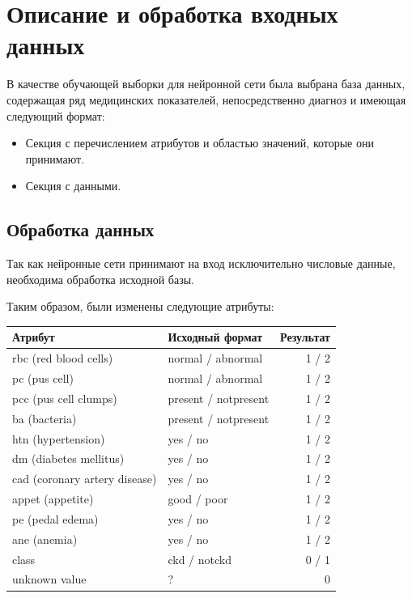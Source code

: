 \section{Описание и обработка входных данных}
 В качестве обучающей выборки для нейронной сети была выбрана база данных, содержащая ряд медицинских показателей, непосредственно диагноз и имеющая следующий формат:
 
 \begin{itemize}
 	\item
 		Секция с перечислением атрибутов и областью значений, которые они принимают.
 	\item 
 		Секция с данными.
 \end{itemize}
 
\subsection{Обработка данных}

	Так как нейронные сети принимают на вход исключительно числовые данные, необходима обработка исходной базы.
	
	Таким образом, были изменены следующие атрибуты:
	\\
	\begin{table}[H]
	\centering
	\begin{tabular}{llr}
	\toprule
	Атрибут  & Исходный формат & Результат \\
	\midrule 
	 rbc (red blood cells)      & normal / abnormal    & 1 / 2 \\
	 pc (pus cell)      & normal / abnormal    & 1 / 2 \\
	 pcc (pus cell clumps)      & present / notpresent    & 1 / 2 \\
	 ba (bacteria)      & present / notpresent   & 1 / 2 \\
	 htn (hypertension)      & yes / no   & 1 / 2 \\
	 dm (diabetes mellitus)      & yes / no   & 1 / 2 \\
	 cad (coronary artery disease)      & yes / no   & 1 / 2 \\
	 appet (appetite)      & good / poor   & 1 / 2 \\
	 pe (pedal edema)      & yes / no   & 1 / 2 \\
	 ane (anemia)      & yes / no   & 1 / 2 \\
	 class      & ckd / notckd   & 0 / 1 \\
	 unknown value & ?  & 0 \\

	\bottomrule
	\end{tabular}
	\end{table}


